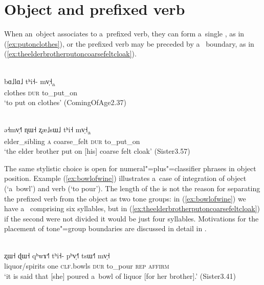  

\section{Object and prefixed verb}
\label{sec:objectandprefixedverb}

When an~object associates to a~prefixed verb, they can form a~single , as in
(\ref{ex:putonclothes}), or the prefixed verb may be preceded by a~ boundary, as in
(\ref{ex:theelderbrotherputoncoarsefeltcloak}).


\begin{exe}
  \ex
  \label{ex:putonclothes}
  \\
  \gll bɑ˩lɑ˩		tʰi˧-	mv̩˧\textsubscript{a}\\
  clothes		\textsc{dur}	to\_put\_on\\
  \glt ‘to put on clothes’ (ComingOfAge2.37)

  
  \ex
  \label{ex:theelderbrotherputoncoarsefeltcloak}
  \\
  \gll ə˧mv̩˧˥		ɳɯ˧	ʐæ˩sɯ˩		tʰi˧	mv̩˧\textsubscript{a}\\
  elder\_sibling	\textsc{a}	coarse\_felt	\textsc{dur}	to\_put\_on\\
  \glt ‘the elder brother put on [his] coarse felt cloak’ (Sister3.57)
\end{exe}

The same stylistic choice is open for numeral"=plus"=classifier phrases in object position. Example (\ref{ex:bowlofwine}) illustrates a~case of integration of object (‘a~bowl’) and verb (‘to pour’). The length of the  is not the reason for separating the prefixed verb from the object as two tone groups: in (\ref{ex:bowlofwine}) we have a~ comprising six syllables, but in (\ref{ex:theelderbrotherputoncoarsefeltcloak}) if the second  were not divided it would be just four syllables. Motivations for the placement of tone"=group boundaries are discussed in detail in .

\begin{exe}
  \ex
  \label{ex:bowlofwine}
  \\
  \gll ʐɯ˧		ɖɯ˧	qʰwɤ˧˥		tʰi˧-	pʰv̩˧˥	  tsɯ˧˥	mv̩˧\\
  liquor/spirits		one	\textsc{clf}.bowls	\textsc{dur}	to\_pour	  \textsc{rep}	\textsc{affirm}\\
  \glt ‘it is said that [she] poured a~bowl of liquor [for her brother].’ (Sister3.41)
\end{exe}

